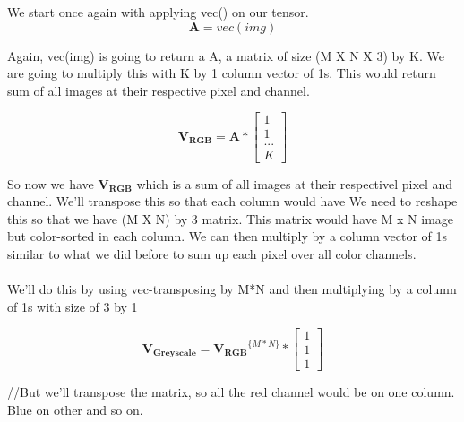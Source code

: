 \documentclass{article}
\newcommand{\matr}[1]{\mathbf{#1}}
\begin{document}
		We start once again with applying vec() on our tensor.\\

		\begin{equation*}
		\matr{A} = vec(img)
		\end{equation*}

		Again, vec(img) is going to return a A, a matrix of size (M X N X 3) by K. We are going to multiply this with K by 1 column vector of 1s. 
		This would return sum of all images at their respective pixel and channel.

		\begin{equation*}
		\matr{V_{RGB}} = \matr{A} * 
						\begin{bmatrix} 
						1 \\ 1 \\ ... \\ K 
						\end{bmatrix} 
		\end{equation*}	
		
		So now we have $\matr{V_{RGB}}$ which is a sum of all images at their respectivel pixel and channel. We'll transpose this so that
		each column would have 
	We need to reshape this so that
		we have (M X N) by 3 matrix. This matrix would have M x N image but color-sorted in each column.  
		We can then multiply by a column vector of 1s similar to what we did before to sum up each pixel over all color channels. \\
		\\
		We'll do this by using vec-transposing by M*N and then multiplying by a column of 1s with size of 3 by 1

		\begin{equation*}
		\matr{V_{Greyscale}} = \matr{V_{RGB}}^{\{ M*N \}} * 
						\begin{bmatrix} 
						1 \\ 1 \\ 1  
						\end{bmatrix} 
		\end{equation*}	
		
		//But we'll transpose the matrix, so all the red channel would be on one column. Blue on other and so on. 
		
\end{document}
